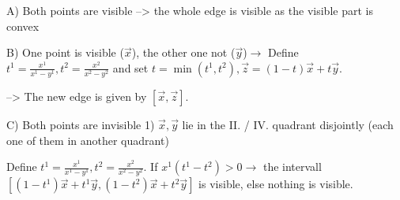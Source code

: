 \documentclass[titlepage]{scrartcl}
\begin{document}
A) Both points are visible --> the whole edge is visible as the visible part is convex

B) One point is visible ($\vec{x}$), the other one not ($\vec{y}$)$\rightarrow$
Define $t^1 = \frac{x^1}{x^1 - y^1}, t^2 = \frac{x^2}{x^2 - y^2}$ and set $ t = \min(t^1, t^2), \vec{z} = (1 - t) \vec{x} + t \vec{y}$.

--> The new edge is given by $[\vec{x}, \vec{z}]$.

C) Both points are invisible
1) $\vec{x}, \vec{y}$ lie in the II. / IV. quadrant disjointly (each one of them in another quadrant)

Define $t^1 = \frac{x^1}{x^1 - y^1}, t^2 = \frac{x^2}{x^2 - y^2}$. If $x^1 (t^1 - t^2) > 0 \rightarrow $ the intervall $[(1 - t^1) \vec{x} + t^1 \vec{y}, (1 - t^2) \vec{x} + t^2 \vec{y}]$ is visible, else nothing is visible. 
\end{document}

